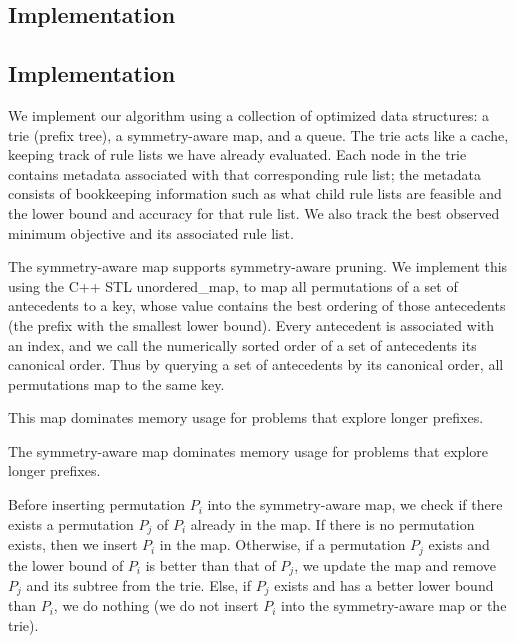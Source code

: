 \begin{kdd}
\section{Implementation}
\label{sec:implementation}
\end{kdd}



\begin{arxiv}
\section{Implementation}
\label{sec:implementation}
\end{arxiv}

We implement our algorithm using a collection of optimized data structures:
a trie (prefix tree), a symmetry-aware map, and a queue.
The trie acts like a cache, keeping track of rule lists we have already evaluated.
Each node in the trie contains metadata associated with that corresponding rule list;
the metadata consists of bookkeeping information such as what child rule lists are feasible and
the lower bound and accuracy for that rule list.
We also track the best observed minimum objective and its associated rule list.

The symmetry-aware map supports symmetry-aware pruning.
%
We implement this using the C++ STL unordered\_map,
to map all permutations of a set of antecedents to a key, whose value
contains the best ordering of those antecedents (\ie the prefix with the smallest lower bound).
%
Every antecedent is associated with an index, and we call the numerically
sorted order of a set of antecedents its canonical order.
%
Thus by querying a set of antecedents by its canonical order, all
permutations map to the same key.
%
%
\begin{kdd}
This map dominates memory usage for problems that explore longer prefixes.
\end{kdd}
\begin{arxiv}
The symmetry-aware map dominates memory usage for problems that explore longer prefixes.
\end{arxiv}
%
Before inserting permutation $P_i$ into the symmetry-aware map, we check
if there exists a permutation $P_j$ of $P_i$ already in the map.
If there is no permutation exists, then we insert $P_i$ in the map.
Otherwise, if a permutation $P_j$ exists and the lower bound of $P_i$ is better than 
that of $P_j$, we update the map and remove $P_j$ and its subtree from the trie.
Else, if $P_j$ exists and has a better lower bound than $P_i$, we do nothing 
(\ie we do not insert $P_i$ into the symmetry-aware map or the trie).

